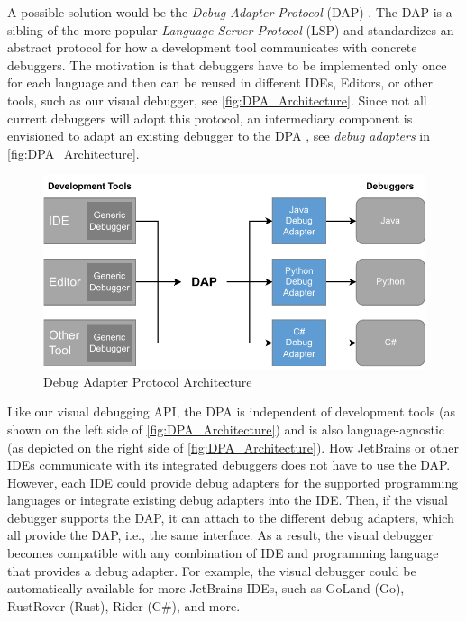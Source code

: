 \documentclass[sigconf]{acmart}
\begin{document}
A possible solution would be the \textit{Debug Adapter Protocol} (DAP) \cite{microsoftDebugAdapterProtocol2023}.
The DAP is a sibling of the more popular \textit{Language Server Protocol} (LSP) \cite{microsoftLanguageServerProtocol2023} and standardizes an abstract protocol for how a development tool communicates with concrete debuggers.
The motivation is that debuggers have to be implemented only once for each language and then can be reused in different IDEs, Editors, or other tools, such as our visual debugger, see \autoref{fig:DPA_Architecture}.
Since not all current debuggers will adopt this protocol, an intermediary component is envisioned to adapt an existing debugger to the DPA \cite{microsoftDebugAdapterProtocol2023}, see \textit{debug adapters} in \autoref{fig:DPA_Architecture}.

\begin{figure}[ht]
  \centering
  \includegraphics[width=1\linewidth]{images/visual-debugger-DPA-architecture.pdf}
  \caption{Debug Adapter Protocol Architecture \cite{microsoftDebugAdapterProtocol2023}}
  \label{fig:DPA_Architecture}
\end{figure}

Like our visual debugging API, the DPA is independent of development tools (as shown on the left side of \autoref{fig:DPA_Architecture}) and is also language-agnostic (as depicted on the right side of \autoref{fig:DPA_Architecture}).
How JetBrains or other IDEs communicate with its integrated debuggers does not have to use the DAP.
However, each IDE could provide debug adapters for the supported programming languages or integrate existing debug adapters into the IDE.
Then, if the visual debugger supports the DAP, it can attach to the different debug adapters, which all provide the DAP, i.e., the same interface.
As a result, the visual debugger becomes compatible with any combination of IDE and programming language that provides a debug adapter.
For example, the visual debugger could be automatically available for more JetBrains IDEs, such as GoLand (Go), RustRover (Rust), Rider (C\#), and more.
\end{document}
